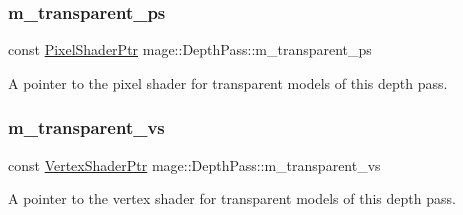 \subsubsection{\texorpdfstring{m\+\_\+transparent\+\_\+ps}{m\_transparent\_ps}}
{\footnotesize\ttfamily const \hyperlink{namespacemage_acbec875bb5e5e085e32ed244a24d2b6f}{Pixel\+Shader\+Ptr} mage\+::\+Depth\+Pass\+::m\+\_\+transparent\+\_\+ps\hspace{0.3cm}{\ttfamily [private]}}

A pointer to the pixel shader for transparent models of this depth pass. \hypertarget{classmage_1_1_depth_pass_acf3baa6d4956c9c8d9ffc27ea1586cc3}{}\label{classmage_1_1_depth_pass_acf3baa6d4956c9c8d9ffc27ea1586cc3} 
\subsubsection{\texorpdfstring{m\+\_\+transparent\+\_\+vs}{m\_transparent\_vs}}
{\footnotesize\ttfamily const \hyperlink{namespacemage_a1f19b094f771e30bc0a6c1cebcc0dd58}{Vertex\+Shader\+Ptr} mage\+::\+Depth\+Pass\+::m\+\_\+transparent\+\_\+vs\hspace{0.3cm}{\ttfamily [private]}}

A pointer to the vertex shader for transparent models of this depth pass. 